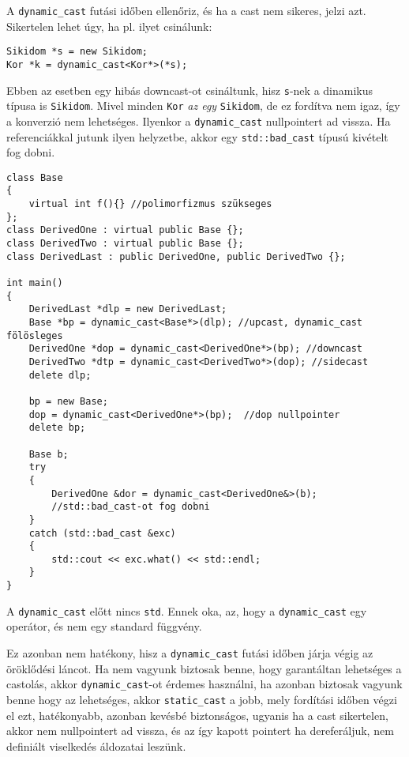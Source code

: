\documentclass[a4paper,11.5pt,table]{article}
\begin{document}
	A \texttt{dynamic\_cast} futási időben ellenőriz, és ha a cast nem sikeres, jelzi azt. Sikertelen lehet úgy, ha pl. ilyet csinálunk:
	\begin{lstlisting}
Sikidom *s = new Sikidom;
Kor *k = dynamic_cast<Kor*>(*s);
	\end{lstlisting}
	Ebben az esetben egy hibás downcast-ot csináltunk, hisz \texttt{s}-nek a dinamikus típusa is \texttt{Sikidom}. Mivel minden \texttt{Kor} \textit{az egy} \texttt{Sikidom}, de ez fordítva nem igaz, így a konverzió nem lehetséges. Ilyenkor a \texttt{dynamic\_cast} nullpointert ad vissza. Ha referenciákkal jutunk ilyen helyzetbe, akkor egy \texttt{std::bad\_cast} típusú kivételt fog dobni.
	\begin{lstlisting}
class Base 
{
	virtual int f(){} //polimorfizmus szükseges
};
class DerivedOne : virtual public Base {};
class DerivedTwo : virtual public Base {};
class DerivedLast : public DerivedOne, public DerivedTwo {};

int main()
{
	DerivedLast *dlp = new DerivedLast;
	Base *bp = dynamic_cast<Base*>(dlp); //upcast, dynamic_cast fölösleges
	DerivedOne *dop = dynamic_cast<DerivedOne*>(bp); //downcast
	DerivedTwo *dtp = dynamic_cast<DerivedTwo*>(dop); //sidecast
	delete dlp;
	
	bp = new Base;
	dop = dynamic_cast<DerivedOne*>(bp);  //dop nullpointer
	delete bp;
	
	Base b;
	try
	{
		DerivedOne &dor = dynamic_cast<DerivedOne&>(b); 
		//std::bad_cast-ot fog dobni
	}
	catch (std::bad_cast &exc)
	{
		std::cout << exc.what() << std::endl;
	}
}
	\end{lstlisting}	
	\begin{note}
		A \texttt{dynamic\_cast} előtt nincs \texttt{std}. Ennek oka, az, hogy a \texttt{dynamic\_cast} egy operátor, és nem egy standard függvény.
	\end{note}
	
	Ez azonban nem hatékony, hisz a \texttt{dynamic\_cast} futási időben járja végig az öröklődési láncot. Ha nem vagyunk biztosak benne, hogy garantáltan lehetséges a castolás, akkor \texttt{dynamic\_cast}-ot érdemes használni, ha azonban biztosak vagyunk benne hogy az lehetséges, akkor \texttt{static\_cast} a jobb, mely fordítási időben végzi el ezt, hatékonyabb, azonban kevésbé biztonságos, ugyanis ha a cast sikertelen, akkor nem nullpointert ad vissza, és az így kapott pointert ha dereferáljuk, nem definiált viselkedés áldozatai leszünk.
\end{document}
